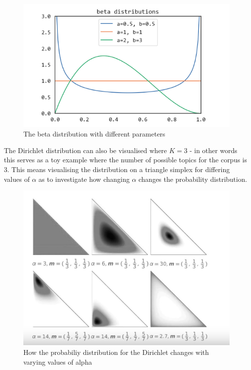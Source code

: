 \documentclass[
]{article}
\begin{document}
\begin{figure}

{\centering \includegraphics[width=1\linewidth]{images/Beta distribution} 

}

\caption{The beta distribution with different parameters}\label{fig:betadist}
\end{figure}

The Dirichlet distribution can also be visualised where \(K=3\) - in
other words this serves as a toy example where the number of possible
topics for the corpus is 3. This means visualising the distribution on a
triangle simplex for differing values of \(\alpha\) as to investigate
how changing \(\alpha\) changes the probability distribution.

\begin{figure}

{\centering \includegraphics[width=1\linewidth]{images/dirichlet2} 

}

\caption{How the probabiliy distribution for the Dirichlet changes with varying values of alpha}\label{fig:dirivis2}
\end{figure}
\end{document}
